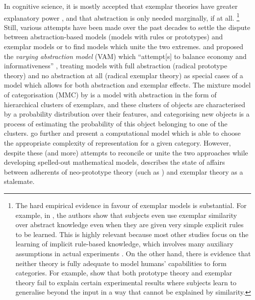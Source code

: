 In cognitive science, it is mostly accepted that exemplar theories have greater explanatory power \citep[184]{Vanpaemel2016}, and that abstraction is only needed marginally, if at all.%
\footnote{The hard empirical evidence in favour of exemplar models is substantial.
  For example, in \cite{HahnEa2010}, the authors show that subjects even use exemplar similarity over abstract knowledge even when they are given very simple explicit rules to be learned.
  This is highly relevant because most other studies focus on the learning of implicit rule-based knowledge, which involves many auxiliary assumptions in actual experiments \citep[2]{HahnEa2010}.
On the other hand, there is evidence that neither theory is fully adequate to model humans' capabilities to form categories.
For example, \cite{ConawayKurtz2016} show that both prototype theory and exemplar theory fail to explain certain experimental results where subjects learn to generalise beyond the input in a way that cannot be explained by similarity.
}
Still, various attempts have been made over the past decades to settle the dispute between abstraction-based models (models with rules or prototypes) and exemplar models or to find models which unite the two extremes.
\cite{VanpaemelStorms2008} and \citet{LeeVanpaemel2008} proposed the \textit{varying abstraction model} (VAM) which ``attempt[s] to balance economy and informativeness'' \citep[745]{LeeVanpaemel2008}, treating models with full abstraction (radical prototype theory) and no abstraction at all (radical exemplar theory) as special cases of a model which allows for both abstraction and exemplar effects.
The mixture model of categorisation (MMC) by \cite{Rosseel2002} is a model with abstraction in the form of hierarchical clusters of exemplars, and these clusters of objects are characterised by a probability distribution over their features, and categorising new objects is a process of estimating the probability of this object belonging to one of the clusters.
\cite{GriffithsEa2009} go further and present a computational model which is able to choose the appropriate complexity of representation for a given category.
However, despite these (and more) attempts to reconcile or unite the two approaches while developing spelled-out mathematical models, \cite[183--184]{Vanpaemel2016} describes the state of affairs between adherents of neo-prototype theory (such as \citealp{MindaSmith2001,MindaSmith2002}) and exemplar theory as a stalemate.

